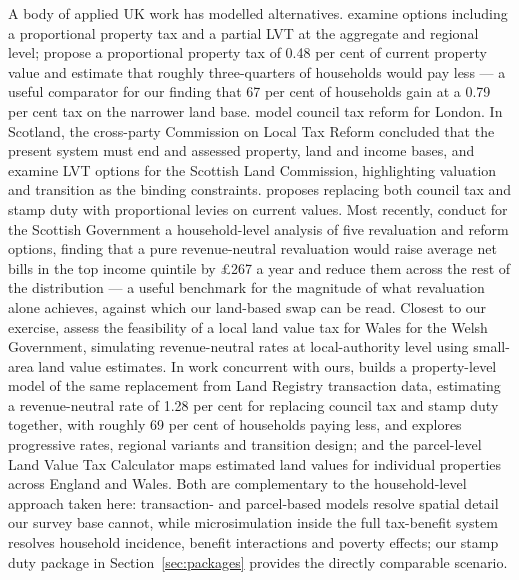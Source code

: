 A body of applied UK work has modelled alternatives. \citet{corlett2018} examine options including a proportional property tax and a partial LVT at the aggregate and regional level; \citet{fairershare2021} propose a proportional property tax of 0.48 per cent of current property value and estimate that roughly three-quarters of households would pay less --- a useful comparator for our finding that 67 per cent of households gain at a 0.79 per cent tax on the narrower land base. \citet{ippr2019} model council tax reform for London. In Scotland, the cross-party Commission on Local Tax Reform \citep{scotgov2015} concluded that the present system must end and assessed property, land and income bases, and \citet{hughes2018} examine LVT options for the Scottish Land Commission, highlighting valuation and transition as the binding constraints. \citet{leunig2024} proposes replacing both council tax and stamp duty with proportional levies on current values. Most recently, \citet{ifs2025scotland} conduct for the Scottish Government a household-level analysis of five revaluation and reform options, finding that a pure revenue-neutral revaluation would raise average net bills in the top income quintile by \pounds 267 a year and reduce them across the rest of the distribution --- a useful benchmark for the magnitude of what revaluation alone achieves, against which our land-based swap can be read. Closest to our exercise, \citet{apgwilym2020} assess the feasibility of a local land value tax for Wales for the Welsh Government, simulating revenue-neutral rates at local-authority level using small-area land value estimates. In work concurrent with ours, \citet{neidle2026} builds a property-level model of the same replacement from Land Registry transaction data, estimating a revenue-neutral rate of 1.28 per cent for replacing council tax and stamp duty together, with roughly 69 per cent of households paying less, and explores progressive rates, regional variants and transition design; and the parcel-level Land Value Tax Calculator \citep{lvtcalculator} maps estimated land values for individual properties across England and Wales. Both are complementary to the household-level approach taken here: transaction- and parcel-based models resolve spatial detail our survey base cannot, while microsimulation inside the full tax-benefit system resolves household incidence, benefit interactions and poverty effects; our stamp duty package in Section~\ref{sec:packages} provides the directly comparable scenario.

